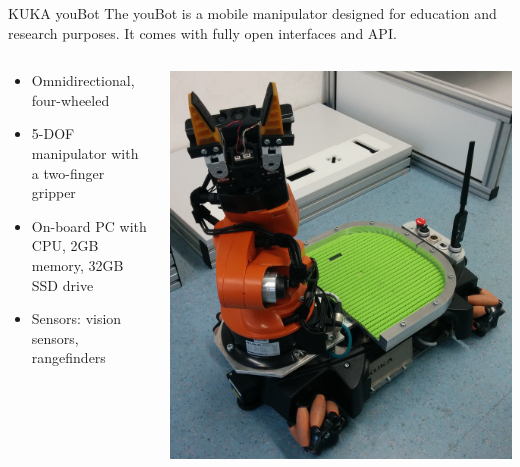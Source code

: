 \documentclass[12pt,aspectratio=43,xcolor={usenames,dvipsnames,table}]{beamer}
\begin{document}
\begin{frame}{KUKA youBot}
The youBot is a mobile manipulator designed for education and research purposes. It comes with fully open interfaces and API. 
\begin{columns}
    \begin{column}{0.6\textwidth}
        \begin{itemize}
            \item Omnidirectional, four-wheeled
            \item 5-DOF manipulator with a two-finger gripper
            \item On-board PC with CPU, 2GB memory, 32GB SSD drive
            \item Sensors: vision sensors, rangefinders
        \end{itemize} 
    \end{column}
    \begin{column}{0.4\textwidth} %
        \centering
        \includegraphics[width=\linewidth]{gfx/youbot.jpg}
    \end{column}
    
\end{columns}
\end{frame}
\end{document}
